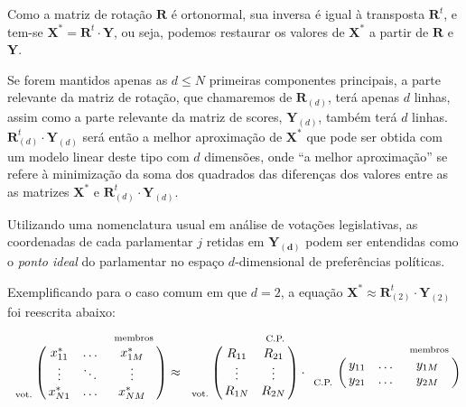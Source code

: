 \documentclass[
	article,			%
	12pt,				%
	oneside,			%
	a4paper,			%
	english,			%
	brazil,				%
	sumario=tradicional,
	oldfontcommands %
	]{abntex2}
\let\bbordermatrix\bordermatrix
\begin{document}


Como a matriz de rotação $\mathbf{R}$ é ortonormal, sua inversa é igual à transposta $\mathbf{R}^{t}$, e tem-se $\mathbf{X^{*}} = \mathbf{R}^t \cdot \mathbf{Y}$, ou seja, podemos restaurar os valores de $\mathbf{X^{*}}$ a partir de $\mathbf{R}$ e $\mathbf{Y}$.

Se forem mantidos apenas as $d \leq N$ primeiras componentes principais, a parte relevante da matriz de rotação, que chamaremos de $\mathbf{R}_{(d)}$, terá apenas $d$ linhas, assim como a parte relevante da matriz de scores, $\mathbf{Y}_{(d)}$, também terá $d$ linhas. $\mathbf{R}_{(d)}^{t}\cdot \mathbf{Y}_{(d)}$ será então a melhor aproximação de $\mathbf{X^{*}}$ que pode ser obtida com um modelo linear deste tipo com $d$ dimensões, onde ``a melhor aproximação'' se refere à minimização da soma dos quadrados das diferenças dos valores entre as as matrizes $\mathbf{X^*}$ e $\mathbf{R}_{(d)}^{t}\cdot \mathbf{Y}_{(d)}$. 

Utilizando uma nomenclatura usual em análise de votações legislativas, as coordenadas de cada parlamentar $j$ retidas em $\mathbf{Y_{(d)}}$ podem ser entendidas como o \emph{ponto ideal} do parlamentar no espaço $d$-dimensional de preferências políticas.

Exemplificando para o caso comum em que $d=2$, a equação $\mathbf{X^{*}} \approx \mathbf{R}_{(2)}^{t} \cdot \mathbf{Y}_{(2)}$ foi reescrita abaixo:
\[
  \bbordermatrix{~  & ~ & ~ & ~_\text{membros} \cr
                ~ & x^{*}_{11} & \ldots & x^{*}_{1M}   \cr
                ~ & \vdots & \ddots & \vdots  \cr
                ~_\text{vot.} & x^{*}_{N1} & \ldots & x^{*}_{NM}   \cr
                } \approx
  \bbordermatrix{~  & ~ & ~_\text{C.P.} \cr
                ~ & R_{11} & R_{21}   \cr
                ~ & \vdots & \vdots  \cr
                ~_\text{vot.} & R_{1N} & R_{2N} \cr
                } \cdot
  \bbordermatrix{~  & ~ & ~ & ~_\text{membros} \cr
                ~ & y_{11} & \ldots & y_{1M}   \cr
                ~_\text{C.P.} & y_{21} & \ldots & y_{2M}   \cr
                }
\]
\end{document}
